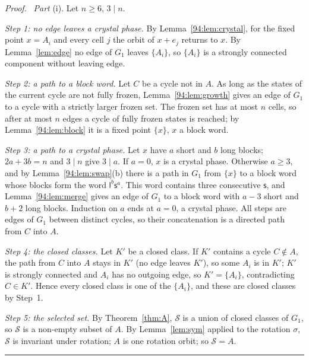 \documentclass[10pt,a4paper]{article}
\newcommand{\qedmark}{\rule{1.1ex}{1.1ex}}
\newenvironment{proof}[1][Proof]{\par\smallskip\noindent\textit{#1.}\ }{\hfill\qedmark\par\smallskip}
\newcommand{\Sel}{\mathcal{S}}                %
\newcommand{\Gone}{G_1}                       %
\begin{document}
\begin{proof}
\emph{Part} (i). Let $n\ge6$, $3\mid n$.

\emph{Step 1: no edge leaves a crystal phase.} By Lemma~\ref{94:lem:crystal}, for the fixed point $x=A_i$ and
every cell $j$ the orbit of $x+e_j$ returns to $x$. By Lemma~\ref{lem:edge} no edge of $\Gone$ leaves $\{A_i\}$,
so $\{A_i\}$ is a strongly connected component without leaving edge.

\emph{Step 2: a path to a block word.} Let $C$ be a cycle not in $A$. As long as the states of the current cycle
are not fully frozen, Lemma~\ref{94:lem:growth} gives an edge of $\Gone$ to a cycle with a strictly larger frozen
set. The frozen set has at most $n$ cells, so after at most $n$ edges a cycle of fully frozen states is reached;
by Lemma~\ref{94:lem:block} it is a fixed point $\{x\}$, $x$ a block word.

\emph{Step 3: a path to a crystal phase.} Let $x$ have $a$ short and $b$ long blocks; $2a+3b=n$ and $3\mid n$ give
$3\mid a$. If $a=0$, $x$ is a crystal phase. Otherwise $a\ge3$, and by Lemma~\ref{94:lem:swap}(b) there is a path
in $\Gone$ from $\{x\}$ to a block word whose blocks form the word $\mathsf{l}^b\mathsf{s}^a$. This word contains
three consecutive $\mathsf{s}$, and Lemma~\ref{94:lem:merge} gives an edge of $\Gone$ to a block word with $a-3$
short and $b+2$ long blocks. Induction on $a$ ends at $a=0$, a crystal phase. All steps are edges of $\Gone$
between distinct cycles, so their concatenation is a directed path from $C$ into $A$.

\emph{Step 4: the closed classes.} Let $K'$ be a closed class. If $K'$ contains a cycle $C\notin A$, the path from
$C$ into $A$ stays in $K'$ (no edge leaves $K'$), so some $A_i$ is in $K'$; $K'$ is strongly connected and $A_i$
has no outgoing edge, so $K'=\{A_i\}$, contradicting $C\in K'$. Hence every closed class is one of the
$\{A_i\}$, and these are closed classes by Step~1.

\emph{Step 5: the selected set.} By Theorem~\ref{thm:A}, $\Sel$ is a union of closed classes of $\Gone$, so $\Sel$
is a non-empty subset of $A$. By Lemma~\ref{lem:sym} applied to the rotation $\sigma$, $\Sel$ is invariant under
rotation; $A$ is one rotation orbit; so $\Sel=A$.


\end{proof}
\end{document}

